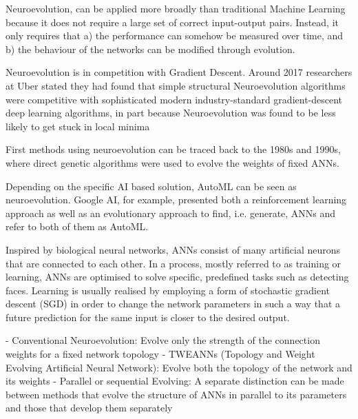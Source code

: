 \documentclass[journal, a4paper]{IEEEtran}
\begin{document}
Neuroevolution, can be applied more broadly than traditional Machine Learning because it does not require a large set of correct input-output pairs. Instead, it only requires that a) the performance can somehow be measured over time, and b) the behaviour of the networks can be modified through evolution. \cite{cite05}

Neuroevolution is in competition with Gradient Descent. Around 2017 researchers at Uber stated they had found that simple structural Neuroevolution algorithms were competitive with sophisticated modern industry-standard gradient-descent deep learning algorithms, in part because Neuroevolution was found to be less likely to get stuck in local minima \cite{cite05}

First methods using neuroevolution can be traced back to the 1980s and 1990s, where direct genetic algorithms were used to evolve the weights of fixed ANNs.\cite{cite05}

Depending on the specific AI based solution, AutoML can be seen as neuroevolution. Google AI, for example, presented both a reinforcement learning approach as well as an evolutionary approach to find, i.e. generate, ANNs and refer to both of them as AutoML. \cite{cite05}

Inspired by biological neural networks, ANNs consist of many artificial neurons that are connected to each other. In a process, mostly referred to as training or learning, ANNs are optimised to solve specific, predefined tasks such as detecting faces. Learning is usually realised by employing a form of stochastic gradient descent (SGD) in order to change the network parameters in such a way that a future prediction for the same input is closer to the desired output. \cite{cite05}


- Conventional Neuroevolution: Evolve only the strength of the connection weights for a fixed network topology
- TWEANNs (Topology and Weight Evolving Artificial Neural Network): Evolve both the topology of the network and its weights
- Parallel or sequential Evolving: A separate distinction can be made between methods that evolve the structure of ANNs in parallel to its parameters and those that develop them separately



\end{document}
